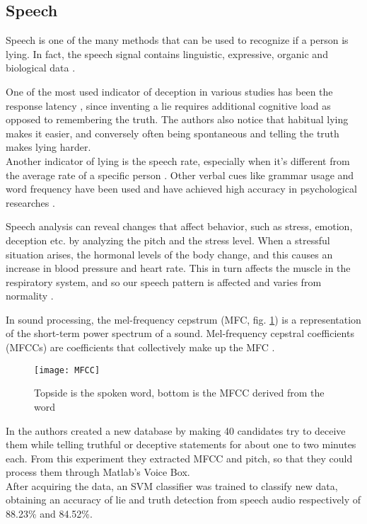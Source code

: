 \subsection{Speech}
Speech is one of the many methods that can be used to recognize if a person is lying. In fact, the speech signal contains linguistic, expressive, organic and biological data \cite{norena}.

One of the most used indicator of deception in various studies has been the response latency \cite{EaseLying}, since inventing a lie requires additional cognitive load as opposed to remembering the truth. The authors also notice that habitual lying makes it easier, and conversely often being spontaneous and telling the truth makes lying harder.\\
Another indicator of lying is the speech rate, especially when it's different from the average rate of a specific person \cite{TemporalCues}. Other verbal cues like grammar usage and word frequency have been used and have achieved high accuracy in psychological researches \cite{PorterTruthLying}.

Speech analysis can reveal changes that affect behavior, such as stress, emotion, deception etc. by analyzing the pitch and the stress level. When a stressful situation arises, the hormonal levels of the body change, and this causes an increase in blood pressure and heart rate. This in turn affects the muscle in the respiratory system, and so our speech pattern is affected and varies from normality \cite{norena}.

In sound processing, the mel-frequency cepstrum (MFC, fig. \ref{fig:MFCC}) is a representation of the short-term power spectrum of a sound. Mel-frequency cepstral coefficients (MFCCs) are coefficients that collectively make up the MFC \cite{wiki:mfcc}.

\begin{figure}[H]
	\centering
	\texttt{[image: MFCC]}
	\caption{Topside is the spoken word, bottom is the MFCC derived from the word}
	\label{fig:MFCC}
\end{figure}

In \cite{relidss} the authors created a new database by making 40 candidates try to deceive them while telling truthful or deceptive statements for about one to two minutes each. From this experiment they extracted MFCC and pitch, so that they could process them through Matlab's Voice Box. \\
After acquiring the data, an SVM classifier was trained to classify new data, obtaining an accuracy of lie and truth detection from speech audio respectively of 88.23\% and 84.52\%.

